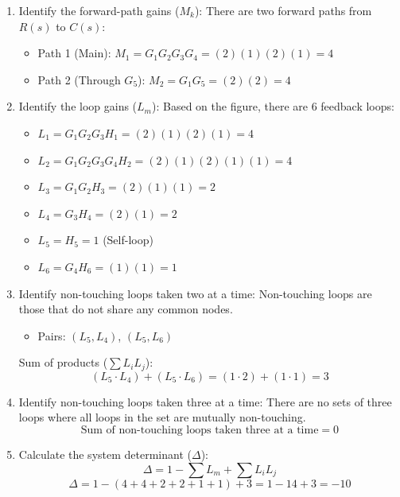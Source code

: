 \documentclass[11pt]{article}
\begin{document}
\begin{enumerate}[label=(\alph*), itemindent=*, leftmargin=*, nolistsep]
    \item Identify the forward-path gains ($M_k$):
    There are two forward paths from $R(s)$ to $C(s)$:
    \begin{itemize}
        \item Path 1 (Main): \( M_1 = G_1 G_2 G_3 G_4 = (2)(1)(2)(1) = 4 \)
        \item Path 2 (Through $G_5$): \( M_2 = G_1 G_5 = (2)(2) = 4 \)
    \end{itemize}

    \item Identify the loop gains ($L_m$):
    Based on the figure, there are 6 feedback loops:
    \begin{itemize}
        \item $L_1 = G_1 G_2 G_3 H_1 = (2)(1)(2)(1) = 4$
        \item $L_2 = G_1 G_2 G_3 G_4 H_2 = (2)(1)(2)(1)(1) = 4$
        \item $L_3 = G_1 G_2 H_3 = (2)(1)(1) = 2$
        \item $L_4 = G_3 H_4 = (2)(1) = 2$
        \item $L_5 = H_5 = 1$ (Self-loop)
        \item $L_6 = G_4 H_6 = (1)(1) = 1$
    \end{itemize}

    \item Identify non-touching loops taken two at a time:
    Non-touching loops are those that do not share any common nodes.
    \begin{itemize}
        \item Pairs: $(L_5, L_4)$, $(L_5, L_6)$
    \end{itemize}
    Sum of products ($\sum L_i L_j$):
    \[
    (L_5 \cdot L_4) + (L_5 \cdot L_6) = (1 \cdot 2) + (1 \cdot 1) = 3
    \]

    \item Identify non-touching loops taken three at a time:
    There are no sets of three loops where all loops in the set are mutually non-touching.
    \[
    \text{Sum of non-touching loops taken three at a time} = 0
    \]

    \item Calculate the system determinant ($\Delta$):
    \[
    \Delta = 1 - \sum L_m + \sum L_i L_j
    \]
    \[
    \Delta = 1 - (4 + 4 + 2 + 2 + 1 + 1) + 3 = 1 - 14 + 3 = \boxed{-10}
    \]


\end{enumerate}
\end{document}
